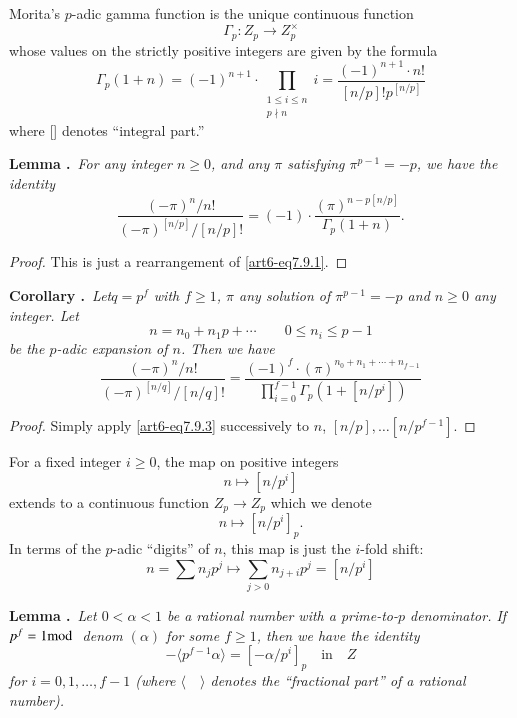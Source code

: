 Morita's $p$-adic gamma function is the unique continuous function
$$
\Gamma_{p} : Z_{p}\to Z^{\times}_{p}
$$
whose values on the strictly positive integers are given by the formula
\begin{equation*}
\Gamma_{p}(1+n)=(-1)^{n+1}\cdot \prod\limits_{\substack{1\leq i\leq n\\ p\nmid n}}i=\frac{(-1)^{n+1}\cdot n!}{[n/p]!p^{[n/p]}}\tag{7.9.1}\label{art6-eq7.9.1}
\end{equation*}
where [\quad] denotes ``integral part.''

\medskip
\noindent
{\bf Lemma .\label{art6-lem7.9.2}}~{\em For any integer $n\geq 0$, and any $\pi$ satisfying $\pi^{p-1}=-p$, we have the identity}
\begin{equation*}
\frac{(-\pi)^{n}/n!}{(-\pi)^{[n/p]}/[n/p]!}=(-1)\cdot \frac{(\pi)^{n-p[n/p]}}{\Gamma_{p}(1+n)}.\tag{7.9.3}\label{art6-eq7.9.3}
\end{equation*}

\begin{proof}
This is just a rearrangement of \eqref{art6-eq7.9.1}.
\end{proof}

\medskip
\noindent
{\bf Corollary .\label{art6-coro7.9.4}}~{\em Let\pageoriginale $q=p^{f}$ with $f\geq 1$, $\pi$ any solution of $\pi^{p-1}=-p$ and $n\geq 0$ any integer. Let}
$$
n=n_{0}+n_{1}p+\cdots\qquad 0\leq n_{i}\leq p-1
$$
{\em be the $p$-adic expansion of $n$. Then we have}
\begin{equation*}
\frac{(-\pi)^{n}/n!}{(-\pi)^{[n/q]}/[n/q]!}=\dfrac{(-1)^{f}\cdot (\pi)^{n_{0}+n_{1}+\cdots+n_{f-1}}}{\prod\limits^{f-1}_{i=0}\Gamma_{p}(1+[n/p^{i}])}\tag{7.9.5}\label{art6-eq7.9.5}
\end{equation*}

\begin{proof}
Simply apply \eqref{art6-eq7.9.3} successively to $n$, $[n/p],\ldots [n/p^{f-1}]$. 
\end{proof}

For a fixed integer $i\geq 0$, the map on positive integers
$$
n\mapsto [n/p^{i}]
$$
extends to a continuous function $Z_{p}\to Z_{p}$ which we denote 
$$
n\mapsto [n/p^{i}]_{p}.
$$
In terms of the $p$-adic ``digits'' of $n$, this map is just the $i$-fold shift:
\begin{equation*}
n=\sum n_{j}p^{j}\mapsto \sum\limits_{j>0}n_{j+i}p^{j}=[n/p^{i}]\tag{7.9.6}\label{art6-eq7.9.6}
\end{equation*}

\noindent
{\bf Lemma .\label{art6-lem7.9.7}}~{\em Let $0<\alpha <1$ be a rational number with a prime-to-$p$ denominator. If $p^{f}=1\mod$ denom $(\alpha)$ for some $f\geq 1$, then we have the identity}
\begin{equation*}
-\langle p^{f-1}\alpha\rangle = [-\alpha/p^{i}]_{p}\quad\text{in}\quad Z\tag{7.9.8}\label{art6-eq7.9.8}
\end{equation*}
{\em for $i=0,1,\ldots,f-1$ (where $\langle\quad\rangle$ denotes the ``fractional part'' of a rational number).}

